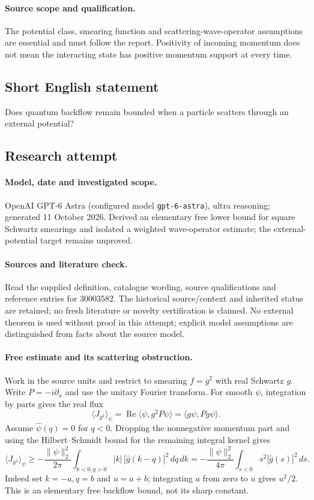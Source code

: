 \documentclass[11pt]{article}
\begin{document}
\paragraph{Source scope and qualification.}
The potential class, smearing function and scattering-wave-operator assumptions are essential and must follow the report. Positivity of incoming momentum does not mean the interacting state has positive momentum support at every time.
\subsection{Short English statement}
Does quantum backflow remain bounded when a particle scatters through an external potential?
\subsection{Research attempt}
\paragraph{Model, date and investigated scope.}
OpenAI GPT-6 Astra (configured model \texttt{gpt-6-astra}), ultra reasoning; generated 11 October 2026. Derived an elementary free lower bound for square Schwartz smearings and isolated a weighted wave-operator estimate; the external-potential target remains unproved.

\paragraph{Sources and literature check.}
Read the supplied definition, catalogue wording, source qualifications and reference entries for 30003582. The historical source/context and inherited status are retained; no fresh literature or novelty certification is claimed. No external theorem is used without proof in this attempt; explicit model assumptions are distinguished from facts about the source model.

\paragraph{Free estimate and its scattering obstruction.} Work in the source units and restrict to smearing \(f=g^2\) with real Schwartz \(g\). Write \(P=-i\partial_x\) and use the unitary Fourier transform. For smooth \(\psi\), integration by parts gives the real flux
\[
 \langle J_{g^2}\rangle_\psi=\operatorname{Re}\langle\psi,g^2P\psi\rangle=\langle g\psi,Pg\psi\rangle.
\]
Assume \(\widehat\psi(q)=0\) for \(q<0\). Dropping the nonnegative momentum part and using the Hilbert--Schmidt bound for the remaining integral kernel gives
\[
 \langle J_{g^2}\rangle_\psi\ge-\frac{\|\psi\|_2^2}{2\pi}
 \int_{k<0,q>0}|k|\,|\widehat g(k-q)|^2\,dq\,dk
 =-\frac{\|\psi\|_2^2}{4\pi}\int_{s<0}s^2|\widehat g(s)|^2\,ds.
\]
Indeed set \(k=-a,q=b\) and \(u=a+b\); integrating \(a\) from zero to \(u\) gives \(u^2/2\). This is an elementary free backflow bound, not its sharp constant.
\end{document}
